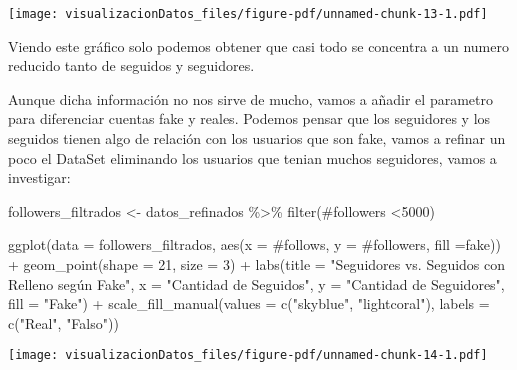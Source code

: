 \documentclass[
  letterpaper,
  DIV=11,
  numbers=noendperiod]{scrreprt}
\newenvironment{Shaded}{\begin{snugshade}}{\end{snugshade}}
\newcommand{\AttributeTok}[1]{\textcolor[rgb]{0.40,0.45,0.13}{#1}}
\newcommand{\DecValTok}[1]{\textcolor[rgb]{0.68,0.00,0.00}{#1}}
\newcommand{\FunctionTok}[1]{\textcolor[rgb]{0.28,0.35,0.67}{#1}}
\newcommand{\NormalTok}[1]{\textcolor[rgb]{0.00,0.23,0.31}{#1}}
\newcommand{\OtherTok}[1]{\textcolor[rgb]{0.00,0.23,0.31}{#1}}
\newcommand{\SpecialCharTok}[1]{\textcolor[rgb]{0.37,0.37,0.37}{#1}}
\newcommand{\StringTok}[1]{\textcolor[rgb]{0.13,0.47,0.30}{#1}}
\begin{document}
\texttt{[image: visualizacionDatos\_files/figure-pdf/unnamed-chunk-13-1.pdf]}

Viendo este gráfico solo podemos obtener que casi todo se concentra a un
numero reducido tanto de seguidos y seguidores.

Aunque dicha información no nos sirve de mucho, vamos a añadir el
parametro para diferenciar cuentas fake y reales. Podemos pensar que los
seguidores y los seguidos tienen algo de relación con los usuarios que
son fake, vamos a refinar un poco el DataSet eliminando los usuarios que
tenian muchos seguidores, vamos a investigar:

\begin{Shaded}
\begin{Highlighting}[]
\NormalTok{followers\_filtrados }\OtherTok{\textless{}{-}}\NormalTok{ datos\_refinados }\SpecialCharTok{\%\textgreater{}\%}  \FunctionTok{filter}\NormalTok{(}\StringTok{\textasciigrave{}}\AttributeTok{\#followers}\StringTok{\textasciigrave{}} \SpecialCharTok{\textless{}}\DecValTok{5000}\NormalTok{)}


\FunctionTok{ggplot}\NormalTok{(}\AttributeTok{data =}\NormalTok{ followers\_filtrados, }\FunctionTok{aes}\NormalTok{(}\AttributeTok{x =} \StringTok{\textasciigrave{}}\AttributeTok{\#follows}\StringTok{\textasciigrave{}}\NormalTok{, }\AttributeTok{y =} \StringTok{\textasciigrave{}}\AttributeTok{\#followers}\StringTok{\textasciigrave{}}\NormalTok{, }\AttributeTok{fill =}\NormalTok{fake)) }\SpecialCharTok{+}
  \FunctionTok{geom\_point}\NormalTok{(}\AttributeTok{shape =} \DecValTok{21}\NormalTok{, }\AttributeTok{size =} \DecValTok{3}\NormalTok{) }\SpecialCharTok{+}
  \FunctionTok{labs}\NormalTok{(}\AttributeTok{title =} \StringTok{"Seguidores vs. Seguidos con Relleno según \textquotesingle{}Fake\textquotesingle{}"}\NormalTok{,}
       \AttributeTok{x =} \StringTok{"Cantidad de Seguidos"}\NormalTok{,}
       \AttributeTok{y =} \StringTok{"Cantidad de Seguidores"}\NormalTok{,}
       \AttributeTok{fill =} \StringTok{"Fake"}\NormalTok{) }\SpecialCharTok{+}
  \FunctionTok{scale\_fill\_manual}\NormalTok{(}\AttributeTok{values =} \FunctionTok{c}\NormalTok{(}\StringTok{"skyblue"}\NormalTok{, }\StringTok{"lightcoral"}\NormalTok{), }\AttributeTok{labels =} \FunctionTok{c}\NormalTok{(}\StringTok{"Real"}\NormalTok{, }\StringTok{"Falso"}\NormalTok{))}
\end{Highlighting}
\end{Shaded}

\texttt{[image: visualizacionDatos\_files/figure-pdf/unnamed-chunk-14-1.pdf]}
\end{document}
